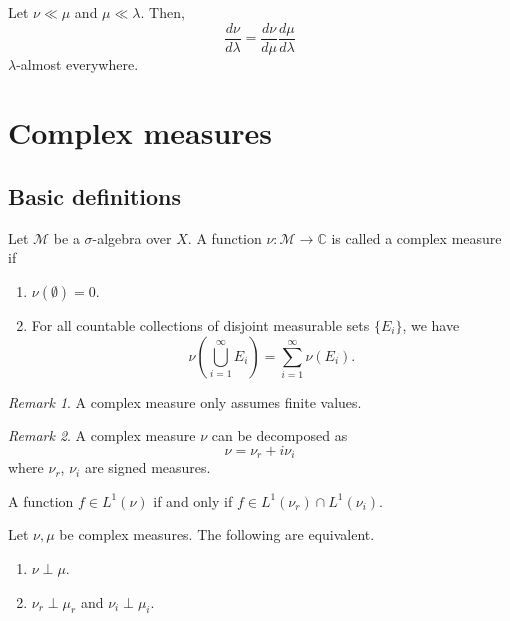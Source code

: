 \documentclass[11pt]{article}
\newcommand{\C}{\mathbb{C}}
\newcommand{\M}{\mathcal{M}}
\theoremstyle{definition}
\theoremstyle{remark}
\newtheorem*{remark}{Remark}
\begin{document}
    \begin{lemma}
        Let $\nu \ll \mu$ and $\mu \ll \lambda$. Then, \[
            \frac{d\nu}{d\lambda} = \frac{d\nu}{d\mu} \frac{d\mu}{d\lambda}
        \] $\lambda$-almost everywhere.
    \end{lemma}



    \section{Complex measures}

    \subsection{Basic definitions}

    \begin{definition}
        Let $\M$ be a $\sigma$-algebra over $X$. A function $\nu\colon \M \to
        \C$ is called a complex measure if \begin{enumerate}
            \item $\nu(\emptyset) = 0$.
            \item For all countable collections of disjoint measurable sets
            $\{E_i\}$, we have \[
                \nu\left(\bigcup_{i = 1}^\infty E_i\right) = \sum_{i = 1}^\infty
                \nu(E_i).
            \]
        \end{enumerate}
        \begin{remark}
            A complex measure only assumes finite values.
        \end{remark}
        \begin{remark}
            A complex measure $\nu$ can be decomposed as \[
                \nu = \nu_r + i \nu_i
            \] where $\nu_r$, $\nu_i$ are signed measures.
        \end{remark}
    \end{definition}

    \begin{definition}
        A function $f \in L^1(\nu)$ if and only if $f \in L^1(\nu_r) \cap
        L^1(\nu_i)$.
    \end{definition}

    \begin{lemma}
        Let $\nu, \mu$ be complex measures. The following are equivalent.
        \begin{enumerate}
            \item $\nu \perp \mu$.
            \item $\nu_r \perp \mu_r$ and $\nu_i \perp \mu_i$.
        \end{enumerate}
    \end{lemma}
\end{document}
